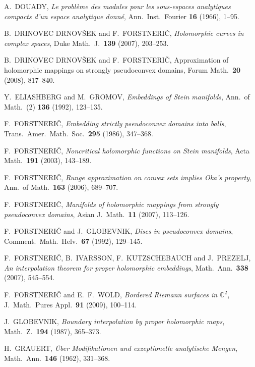 \documentclass[11pt]{amsart}
\numberwithin{equation}{section}
\theoremstyle{definition}
\begin{document}
\begin{thebibliography}{10}
A.\ DOUADY,
\textit{Le probl\`eme des modules pour les sous-espaces analytiques compacts 
d'un espace analytique donn\'e},
Ann.\ Inst.\ Fourier \textbf{16} (1966), 1--95. 

B.\ DRINOVEC DRNOV\v SEK and F.\ FORSTNERI\v C, 
\textit{Holomorphic curves in complex spaces},
Duke Math.\ J.\ \textbf{139} (2007), 203--253.

B.\ DRINOVEC DRNOV\v SEK and F.\ FORSTNERI\v C, 
Approximation of holomorphic mappings on strongly pseudoconvex domains,
Forum Math.\ \textbf{20} (2008), 817--840.

Y.\ ELIASHBERG and M.\ GROMOV, 
\textit{Embeddings of Stein manifolds},
Ann.\ of Math.\ (2) \textbf{136} (1992), 123--135.

F.\ FORSTNERI\v C, 
\textit{Embedding strictly pseudoconvex domains into balls}, 
Trans.\ Amer.\ Math.\ Soc.\ \textbf{295} (1986), 347--368. 

F.\ FORSTNERI\v C,
\textit{Noncritical holomorphic functions on Stein manifolds},
Acta Math.\ \textbf{191} (2003), 143--189.  

F.\ FORSTNERI\v C,
\textit{Runge approximation on convex sets implies Oka's property}, 
Ann.\ of Math.\ \textbf{163} (2006), 689--707.

F.\ FORSTNERI\v C,
\textit{Manifolds of holomorphic mappings from strongly pseudoconvex domains}, 
Asian J.\ Math.\ \textbf{11} (2007), 113--126. 
 
F.\ FORSTNERI\v C and J.\ GLOBEVNIK,
\textit{Discs in pseudoconvex domains}, 
Comment.\ Math.\ Helv.\ \textbf{67} (1992), 129--145.

F.\ FORSTNERI\v C, B.\ IVARSSON, F.\ KUTZSCHEBAUCH and J.\ PREZELJ,
\textit{An interpolation theorem for proper holomorphic embeddings},
Math.\ Ann.\ \textbf{338} (2007), 545--554. 

F.\ FORSTNERI\v C and E.\ F.\ WOLD,
\textit{Bordered Riemann surfaces in ${\mathbb{C}}^2$}, 
J.\ Math.\ Pures Appl.\ \textbf{91} (2009), 100--114.

J.\ GLOBEVNIK,
\textit{Boundary interpolation by proper holomorphic maps},
Math.\ Z.\ \textbf{194} (1987), 365--373. 

H.\ GRAUERT, 
\textit{\"Uber Modifikationen und exzeptionelle analytische Mengen}, 
Math.\ Ann.\ \textbf{146} (1962), 331--368.  


\end{thebibliography}
\end{document}

